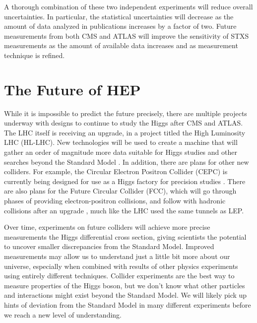 A thorough combination of these two independent experiments will reduce overall uncertainties.
In particular, the statistical uncertainties will decrease as the amount of data analyzed in publications
increases by a factor of two.
Future measurements from both CMS and ATLAS will improve the sensitivity of STXS measurements
as the amount of available data increases and as measurement technique is refined.

\section{The Future of HEP}

While it is impossible to predict the future precisely,
there are multiple projects underway with designs to continue to study the Higgs after CMS and ATLAS.
The LHC itself is receiving an upgrade, in a project titled the High Luminosity LHC (HL-LHC).
New technologies will be used to create a machine that will gather
an order of magnitude more data suitable for Higgs studies and
other searches beyond the Standard Model \cite{osti_1365580}.
In addition, there are plans for other new colliders.
For example, the Circular Electron Positron Collider (CEPC) is currently being designed
for use as a Higgs factory for precision studies \cite{thecepcstudygroup2018cepc}.
There are also plans for the Future Circular Collider (FCC),
which will go through phases of providing electron-positron collisions,
and follow with hadronic collisions after an upgrade \cite{benedikt2020future},
much like the LHC used the same tunnels as LEP.

Over time, experiments on future colliders will achieve more precise measurements
the Higgs differential cross section,
giving scientists the potential to uncover smaller discrepancies from the Standard Model.
Improved measurements may allow us to understand just a little bit more about our universe,
especially when combined with results of other physics experiments using entirely different techniques.
Collider experiments are the best way to measure properties of the Higgs boson,
but we don't know what other particles and interactions might exist beyond the Standard Model.
We will likely pick up hints of deviation from the Standard Model in many different experiments
before we reach a new level of understanding.
